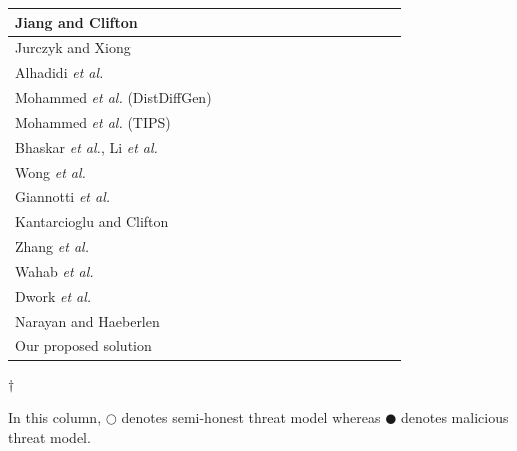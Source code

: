 \documentclass[USenglish,oneside,twocolumn]{article}
\begin{document}
\begin{table}[!t]
{\begin{tabular}{|p{5.7cm}|p{1.0cm}|p{0.7cm}|p{1.4cm}|p{1.1cm}|p{1.4cm}|p{1.1cm}|p{0.7cm}|p{0.8cm}|p{0.6cm}|p{0.8cm}|p{0.6cm}|p{1.1cm}|p{1.5cm}|}
            \hline
            Jiang and Clifton &  &  \centering{$\CIRCLE$} &  & \centering{$\CIRCLE$} &  &  &  &  & \centering{$\CIRCLE$} &  &  & \centering{$\Circle$} &  \tabularnewline
            \hline
            Jurczyk and Xiong &  &  \centering{$\CIRCLE$} &  & \centering{$\CIRCLE$} &  &  &  &  &  & \centering{$\CIRCLE$} &  & \centering{$\Circle$} &  \tabularnewline
            \hline
            Alhadidi \emph{et al.} &  &  \centering{$\CIRCLE$} & \centering{$\CIRCLE$} &  &  &  &  & \centering{$\CIRCLE$} &  &  &  & \centering{$\Circle$} &  \tabularnewline
            \hline
            Mohammed \emph{et al.} (DistDiffGen) &  & \centering{$\CIRCLE$} & \centering{$\CIRCLE$} &  &  &  &  &  & \centering{$\CIRCLE$} &  &  & \centering{$\Circle$} &  \tabularnewline
            \hline
            Mohammed \emph{et al.} (TIPS) &  & \centering{$\CIRCLE$} &  & \centering{$\CIRCLE$} &  &  &  &  & \centering{$\CIRCLE$} &  &  & \centering{$\CIRCLE$} &  \tabularnewline
            \hline
            Bhaskar \emph{et al.}, Li \emph{et al.} & \centering{$\CIRCLE$} &  &  &  & \centering{$\CIRCLE$} &  & \centering{$\CIRCLE$} &  &  &  &  &  &  \tabularnewline
            \hline
            Wong \emph{et al.}  & \centering{$\CIRCLE$} &  &  &  &  &  & \centering{$\CIRCLE$} &  &  &  &  & \centering{$\Circle$} &  \tabularnewline
            \hline
            Giannotti \emph{et al.} & \centering{$\CIRCLE$} &  &  &  &  & \centering{$\CIRCLE$} & \centering{$\CIRCLE$} &  &  &  &  & \centering{$\Circle$} &  \tabularnewline
            \hline
            Kantarcioglu and Clifton & \centering{$\CIRCLE$} &  &  &  &  &  &  &  &  & \centering{$\CIRCLE$} &  & \centering{$\Circle$} &  \tabularnewline
            \hline
            Zhang \emph{et al.} & \centering{$\CIRCLE$} &  &  &  &  &  &  & \centering{$\CIRCLE$} &  &  &  & \centering{$\Circle$} &  \tabularnewline
            \hline
            Wahab \emph{et al.} & \centering{$\CIRCLE$} &  &  &  & \centering{$\CIRCLE$} &  &  & \centering{$\CIRCLE$} &  & \centering{$\CIRCLE$} &  & \centering{$\Circle$} &  \tabularnewline
            \hline
            Dwork \emph{et al.} &  & \centering{$\CIRCLE$} &  &  & \centering{$\CIRCLE$} &  &  &  &  & \centering{$\CIRCLE$} &  & \centering{$\CIRCLE$} &  \tabularnewline
            \hline
            Narayan and Haeberlen &  & \centering{$\CIRCLE$} &  &  & \centering{$\CIRCLE$} &  &  & \centering{$\CIRCLE$} & & \centering{$\CIRCLE$} &  & \centering{$\Circle$} &  \tabularnewline
            \hline\hline
            Our proposed solution &  \centering{$\CIRCLE$} &  &  \centering{$\CIRCLE$} &  &  &  &  & \centering{$\CIRCLE$} & \centering{$\CIRCLE$} & \centering{$\CIRCLE$} & \centering{$\CIRCLE$} & \centering{$\CIRCLE$} & \centering{$\CIRCLE$} \tabularnewline
            \hline
        \end{tabular}
    }
    \vspace{0.01cm}
    \newline
    $\dagger$
    \fontsize{7pt}{12pt}\selectfont
    \raggedright In this column, $\Circle$ denotes semi-honest threat model whereas $\CIRCLE$ denotes malicious threat model.
\end{table}
\end{document}
